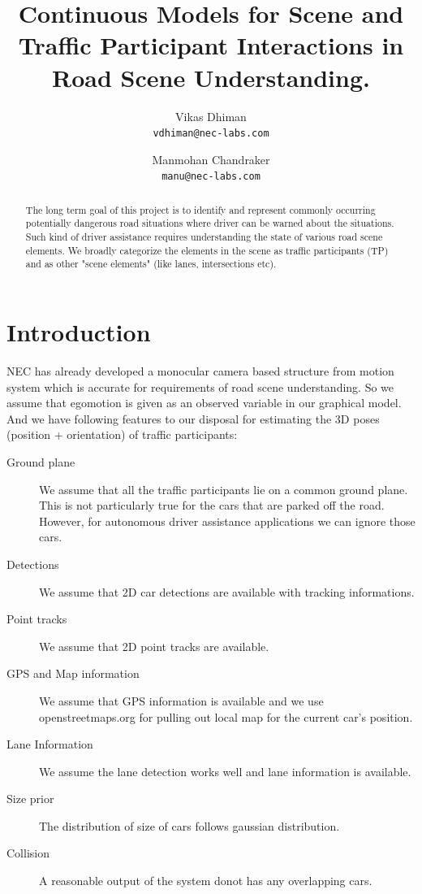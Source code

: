 \documentclass[10pt,twocolumn,letterpaper]{article}
\begin{document}
\title{Continuous Models for Scene and Traffic Participant Interactions in Road Scene Understanding.}
\author{Vikas Dhiman\\
{\tt\small vdhiman@nec-labs.com}
\and
Manmohan Chandraker\\
{\tt\small manu@nec-labs.com}
}
\maketitle

\begin{abstract}
  The long term goal of this project is to identify and represent commonly 
  occurring potentially dangerous road situations where driver can be warned 
  about the situations. Such kind of driver assistance requires understanding
  the state of various road scene elements. We broadly categorize the elements
  in the scene as traffic participants (TP) and as other "scene elements" (like
  lanes, intersections etc). 
\end{abstract}

\section{Introduction}
  NEC has already developed a monocular camera based structure from motion
  system which is accurate for requirements of road scene understanding. So we
  assume that egomotion is given as an observed variable in our graphical
  model. And we have following features to our disposal for estimating the 3D
  poses (position + orientation) of traffic participants:
  \begin{description}
    \item[Ground plane] We assume that all the traffic participants lie on a common ground
      plane. This is not particularly true for the cars that are parked off the
      road. However, for autonomous driver assistance applications we can
      ignore those cars.
    \item[Detections] We assume that 2D car detections are available with tracking informations.
    \item[Point tracks] We assume that 2D point tracks are available.
    \item[GPS and Map information] We assume that GPS information is available
      and we use openstreetmaps.org for pulling out local map for the current
      car's position.
    \item[Lane Information] We assume the lane detection works well and lane
      information is available.
    \item[Size prior] The distribution of size of cars follows gaussian distribution.
    \item[Collision] A reasonable output of the system donot has any overlapping cars.
  \end{description}
\end{document}
